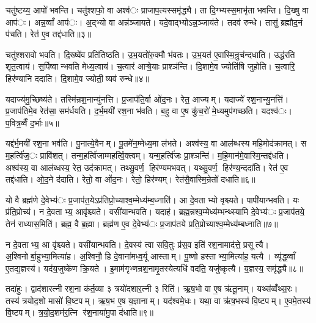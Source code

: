 
चतु॑ष्टय्य॒ आपो॑ भवन्ति। चतु॑श्शफो॒ वा अश्व॑ः प्राजाप॒त्यस्समृ॑द्ध्यै। ता दि॒ग्भ्यस्स॒माभृ॑ता भवन्ति। दि॒ख्षु वा आप॑ः। अन्न॒व्वाँ आप॑ः। अ॒द्भ्यो वा अन्न॑ञ्जायते। यदे॒वाद्भ्योऽन्न॒ञ्जाय॑ते। तदव॑ रुन्धे। तासु॑ ब्रह्मौद॒नं प॑चति। रेत॑ ए॒व तद्द॑धाति॥३॥

चतु॑श्शरावो भवति। दि॒ख्ष्वे॑व प्रति॑तिष्ठति। उ॒भ॒यतो॑रु॒क्मौ भ॑वतः। उ॒भ॒यत॑ ए॒वास्मि॒न्रुच॑न्दधाति। उद्ध॑रति शृत॒त्वाय॑। स॒र्पिष्वान्भवति मेध्य॒त्वाय॑। च॒त्वार॑ आऱ्षे॒याः प्राश्ञ॑न्ति। दि॒शामे॒व ज्योति॑षि जुहोति। च॒त्वारि॒ हिर॑ण्यानि ददाति। दि॒शामे॒व ज्योती॒ष्यव॑ रुन्धे॥४॥

यदाज्य॑मु॒च्छिष्य॑ते। तस्मि॑न्रश॒नान्यु॑नत्ति। प्र॒जाप॑ति॒र्वा ओ॑द॒नः। रेत॒ आज्यम्। यदाज्ये॑ रश॒नान्यु॒नत्ति॑। प्र॒जाप॑तिमे॒व रेत॑सा॒ सम॑र्धयति। द॒र्भ॒मयी॑ रश॒ना भ॑वति। ब॒हु वा ए॒ष कु॑च॒रो॑ मे॒ध्यमुप॑गच्छति। यदश्व॑ः। प॒वित्र॒व्वैँ द॒र्भाः॥५॥

यद्द॑र्भ॒मयी॑ रश॒ना भव॑ति। पु॒नात्ये॒वैनम्। पू॒तमे॑न॒म्मेध्य॒मा ल॑भते। अश्व॑स्य॒ वा आल॑ब्धस्य महि॒मोद॑क्रामत्। स म॒हर्त्वि॑ज॒ः प्रावि॑शत्। तन्म॒हर्त्वि॑जाम्महर्त्वि॒क्त्वम्। यन्म॒हर्त्वि॑जः प्रा॒श्ञन्ति॑। म॒हि॒मान॑मे॒वास्मि॒न्तद्द॑धति। अश्व॑स्य॒ वा आल॑ब्धस्य॒ रेत॒ उद॑क्रामत्। तथ्सु॒वर्ण॒ हिर॑ण्यमभवत्। यथ्सु॒वर्ण॒ हिर॑ण्य॒न्ददा॑ति। रेत॑ ए॒व तद्द॑धाति। ओ॒द॒ने द॑दाति। रेतो॒ वा ओ॑द॒नः। रेतो॒ हिर॑ण्यम्। रेत॑सै॒वास्मि॒न्रेतो॑ दधाति॥६॥


यो वै ब्रह्म॑णे दे॒वेभ्य॑ः प्र॒जाप॑त॒येऽप्र॑तिप्रो॒च्याश्व॒म्मेध्य॑म्ब॒ध्नाति॑। आ दे॒वताभ्यो वृश्च्यते। पापी॑यान्भवति। यः प्र॑ति॒प्रोच्य॑। न दे॒वताभ्य॒ आवृ॑श्च्यते। वसी॑यान्भवति। यदाह॑। ब्रह्म॒न्नश्व॒म्मेध्य॑म्भन्थ्स्यामि दे॒वेभ्य॑ः प्र॒जाप॑तये॒ तेन॑ राध्यास॒मिति॑। ब्रह्म॒ वै ब्र॒ह्मा। ब्रह्म॑ण ए॒व दे॒वेभ्य॑ः प्र॒जाप॑तये प्रति॒प्रोच्याश्व॒म्मेध्य॑म्बध्नाति॥७॥

न दे॒वताभ्य॒ आ वृ॑श्च्यते। वसी॑यान्भवति। दे॒वस्य॑ त्वा सवि॒तुः प्र॑स॒व इति॑ रश॒नामाद॑त्ते॒ प्रसूत्यै। अ॒श्विनोर्बा॒हुभ्या॒मित्या॑ह। अ॒श्विनौ॒ हि दे॒वाना॑मध्व॒र्यू आस्ताम्। पू॒ष्णो हस्ताभ्या॒मित्या॑ह॒ यत्यै। व्यृ॑द्ध॒व्वाँ ए॒तद्य॒ज्ञस्य॑। यद॑य॒जुष्के॑ण क्रि॒यते। इ॒माम॑गृभ्णन्रश॒नामृ॒तस्येत्यधि॑ वदति॒ यजु॑ष्कृत्यै। य॒ज्ञस्य॒ समृ॑द्ध्यै॥८॥

तदा॑हुः। द्वाद॑शारत्नी रश॒ना क॑र्त॒व्या ३ त्रयो॑दशार॒त्नी ३ रिति॑। ऋ॒ष॒भो वा ए॒ष ऋ॑तू॒नाम्। यथ्स॑व्वँथ्स॒रः। तस्य॑ त्रयोद॒शो मासो॑ वि॒ष्टपम्। ऋ॒ष॒भ ए॒ष य॒ज्ञानाम्। यद॑श्वमे॒धः। यथा॒ वा ऋ॑ष॒भस्य॑ वि॒ष्टपम्। ए॒वमे॒तस्य॑ वि॒ष्टपम्। त्र॒यो॒द॒शम॑र॒त्नि र॑श॒नाया॑मु॒पा द॑धाति॥९॥

